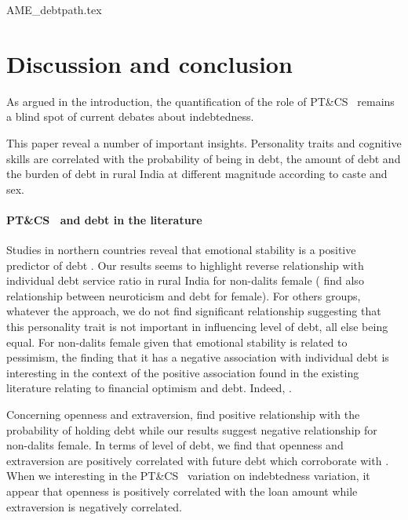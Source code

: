 \documentclass[a4paper, 11pt, onecolumn]{article}
\newcommand{\aebe}{all else being equal}
\newcommand{\PTCS}{PT\&CS}
\begin{document}
{AME_debtpath.tex}



\clearpage
\newpage
\section{Discussion and conclusion}

As argued in the introduction, the quantification of the role of \PTCS~ remains a blind spot of current debates about indebtedness.


This paper reveal a number of important insights.
Personality traits and cognitive skills are correlated with the probability of being in debt, the amount of debt and the burden of debt in rural India at different magnitude according to caste and sex.


\paragraph{\PTCS~ and debt in the literature}
Studies in northern countries reveal that emotional stability is a positive predictor of debt \citep{Nyhus2001}.
Our results seems to highlight reverse relationship with individual debt service ratio in rural India for non-dalits female (\citealp{Brown2014} find also relationship between neuroticism and debt for female).
For others groups, whatever the approach, we do not find significant relationship suggesting that this personality trait is not important in influencing level of debt, \aebe.
For non-dalits female given that emotional stability is related to pessimism, the finding that it has a negative association with individual debt is interesting in the context of the positive association found in the existing literature relating to financial optimism and debt.
Indeed, .

Concerning openness and extraversion, \cite{Brown2014} find positive relationship with the probability of holding debt while our results suggest negative relationship for non-dalits female.
In terms of level of debt, we find that openness and extraversion are positively correlated with future debt which corroborate with \cite{Brown2014}.
When we interesting in the \PTCS~ variation on indebtedness variation, it appear that openness is positively correlated with the loan amount while extraversion is negatively correlated.
\end{document}
